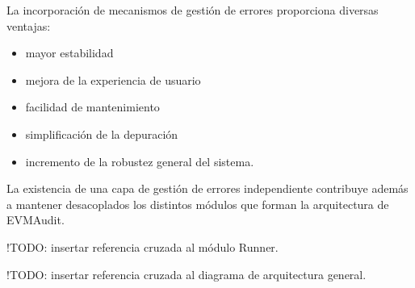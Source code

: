 La incorporación de mecanismos de gestión de errores proporciona
diversas ventajas:

\begin{itemize}
\tightlist
\item
  mayor estabilidad
\item
  mejora de la experiencia de usuario
\item
  facilidad de mantenimiento
\item
  simplificación de la depuración
\item
  incremento de la robustez general del sistema.
\end{itemize}

La existencia de una capa de gestión de errores independiente contribuye
además a mantener desacoplados los distintos módulos que forman la
arquitectura de EVMAudit.

!TODO: insertar referencia cruzada al módulo Runner.

!TODO: insertar referencia cruzada al diagrama de arquitectura general.
